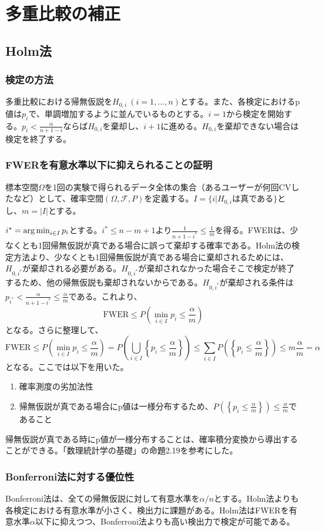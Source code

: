 \section{多重比較の補正}

\subsection{Holm法}

\subsubsection{検定の方法}

多重比較における帰無仮説を$H_{0, i}\ (i = 1, \ldots, n)$とする。また、各検定におけるp値は$p_{i}$で、単調増加するように並んでいるものとする。$i = 1$から検定を開始する。$p_{i} < \frac{\alpha}{n + 1 - i}$ならば$H_{0, i}$を棄却し、$i + 1$に進める。$H_{0, i}$を棄却できない場合は検定を終了する。

\subsubsection{FWERを有意水準以下に抑えられることの証明}

標本空間$\Omega$を1回の実験で得られるデータ全体の集合（あるユーザーが何回CVしたなど）として、確率空間$(\Omega, \mathcal{F}, P)$を定義する。$I = \{i | H_{0, i}は真である\}$とし、$m = |I|$とする。

$i^{\ast} = \operatorname*{arg\,min}_{i \in I} p_{i}$とする。$i^{\ast} \le n - m + 1$より$\frac{1}{n + 1 - i^{\ast}} \le \frac{1}{m}$を得る。FWERは、少なくとも1回帰無仮説が真である場合に誤って棄却する確率である。Holm法の検定方法より、少なくとも1回帰無仮説が真である場合に棄却されるためには、$H_{0, i^{\ast}}$が棄却される必要がある。$H_{0, i^{\ast}}$が棄却されなかった場合そこで検定が終了するため、他の帰無仮説も棄却されないからである。$H_{0, i^{\ast}}$が棄却される条件は$p_{i^{\ast}} < \frac{\alpha}{n + 1 - i^{\ast}} \le \frac{\alpha}{m}$である。これより、
\begin{equation}
    \text{FWER} \le P\left(\min_{i \in I} p_{i} \le \frac{\alpha}{m}\right)
\end{equation}
となる。さらに整理して、
\begin{equation}
    \text{FWER} \le P\left(\min_{i \in I} p_{i} \le \frac{\alpha}{m}\right) = P\left(\bigcup_{i \in I} \left\{p_{i} \le \frac{\alpha}{m}\right\}\right) \le \sum_{i \in I} P\left(\left\{p_{i} \le \frac{\alpha}{m}\right\}\right) \le m \frac{\alpha}{m} = \alpha
\end{equation}
となる。ここでは以下を用いた。
\begin{enumerate}
    \item 確率測度の劣加法性
    \item 帰無仮説が真である場合にp値は一様分布するため、$P\left(\left\{p_{i} \le \frac{\alpha}{m}\right\}\right) \le \frac{\alpha}{m}$であること
\end{enumerate}
帰無仮説が真である時にp値が一様分布することは、確率積分変換から導出することができる。「数理統計学の基礎」の命題2.19を参考にした。

\subsubsection{Bonferroni法に対する優位性}

Bonferroni法は、全ての帰無仮説に対して有意水準を$\alpha/n$とする。Holm法よりも各検定における有意水準が小さく、検出力に課題がある。Holm法はFWERを有意水準$\alpha$以下に抑えつつ、Bonferroni法よりも高い検出力で検定が可能である。
